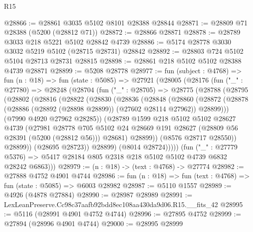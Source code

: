 \begin{lexlean}{R15}
\begin{coremodule}
{{{{{{{{{{{@28866 := @28861 @3035 @5102 @8101 @28388 @28844
@28871 := @28809 @71 @28388 (@5200 (@28812 @71))
@28872 := @28866 @28871
@28878 := @28789 @3033 @218 @5221 @5102 @28842 @4739
@28886 := @5174 @28778 @3030 @3032 @5219 @5102 (@28715 @28731) @28842
@28892 := @28803 @724 @5102 @5104 @28713 @28731 @28815
@28898 := @28861 @218 @5102 @5102 @28388 @4739 @28871
@28899 := @5208 @28778
@28977 := fun (subject : @4768) =>
  fun (n : @18) =>
  fun (state : @5085) =>
  @27921
    (@28005
      (@28176
        (fun ("_" : @27780) =>
        @28248
          (@28704
            (fun ("_" : @28705) =>
            @28775
              (@28788
                (@28795
                  (@28802
                    (@28816
                      (@28822
                        (@28830
                          (@28836
                            (@28848
                              (@28860
                                (@28872
                                  (@28878
                                    (@28886 (@28892 (@28898 @28899)) (@27602 @28114 @27962))
                                    @28899)))
                              (@7990 @4920 @27962 @28285))
                            (@28789
                              @1599
                              @218
                              @5102
                              @5102
                              @28627
                              @4739
                              (@27981
                                @28778
                                @705
                                @5102
                                @24
                                @28669
                                @191
                                @28627
                                (@28809 @56 @28391 (@5200 (@28812 @56)))
                                @28681)
                              @28899))
                          (@8576 @28717 @28550))
                        @28899))
                    (@28695 @28723))
                  @28899)
                (@8014 @28724)))))
        (fun ("_" : @27779 @5376) =>
        @5417 @28184 @805 @2318 @218 @5102 @5102 @4739 @6832 @28242 @6863)))
@28979 := (n : @18) -> (text : @4768) -> @27774
@28982 := @27888 @4752 @4901 @4744
@28986 := fun (n : @18) => fun (text : @4768) => fun (state : @5085) => @6003 @28982
@28987 := @5110 @1557
@28989 := @4926 (@4878 @27884)
@28990 := @28987 @28989
@28991 := LexLeanPreserve.Cc98c37aafb92bdd8ec108aa430da9d06.R15.__fits_42
@28995 := @5116 (@28991 @4901 @4752 @4744)
@28996 := @27895 @4752
@28999 := @27894 (@28996 @4901 @4744)
@29000 := @28995 @28999
}}}}}}}}}}}
\end{coremodule}
\end{lexlean}
